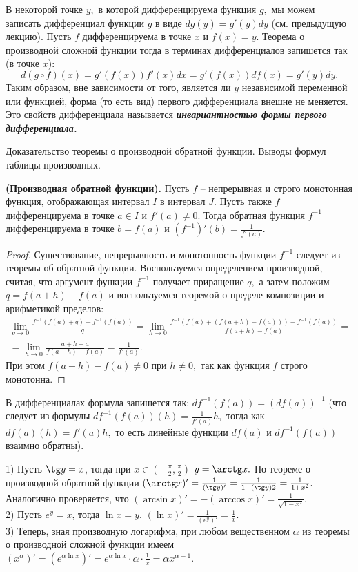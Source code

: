 В некоторой точке $y,$ в которой
дифференцируема функция $g,$
мы можем записать дифференциал
функции $g$ в виде $dg(y)=g'(y)dy$
(см. предыдущую лекцию). Пусть
$f$ дифференцируема в точке $x$
и $f(x)=y.$ Теорема
о производной сложной функции тогда
в терминах дифференциалов запишется
так (в точке $x$):
$$
d(g\circ f)(x)=g'(f(x))f'(x)dx=
g'(f(x))df(x)=g'(y)dy.
$$
Таким образом, вне зависимости от того, является
ли $y$ независимой переменной или функцией,
форма (то есть вид) первого дифференциала
внешне не меняется. Это свойств
дифференциала называется
\textbf{\emph{инвариантностью формы первого
дифференциала.}}
\newpage

\begin{problem}
Доказательство теоремы о производной обратной функции. Выводы формул таблицы
производных.
\end{problem}
\begin{proposition}
\textbf{(Производная обратной функции).}
Пусть $f$ -- непрерывная и строго монотонная функция,
отображающая интервал $I$ в интервал $J.$ Пусть также
$f$ дифференцируема в точке $a\in I$ и $f'(a)\neq0.$
Тогда обратная функция $f^{-1}$ дифференцируема
в точке $b=f(a)$ и $(f^{-1})'(b)=\frac{1}{f'(a)}.$
\end{proposition}
\begin{proof}
Существование, непрерывность и монотонность
функции $f^{-1}$ следует из теоремы об
обратной функции.
Воспользуемся определением производной, считая, что
аргумент функции $f^{-1}$ получает приращение $q,$
а затем положим $q=f(a+h)-f(a)$ и воспользуемся
теоремой о пределе композиции и арифметикой
пределов:
\begin{multline*}
\lim\limits_{q\rightarrow0}
\frac{f^{-1}(f(a)+q)-f^{-1}(f(a))}{q}=
\lim\limits_{h\rightarrow0}
\frac{f^{-1}(f(a)+(f(a+h)-f(a)))-f^{-1}(f(a))}
{f(a+h)-f(a)}=\\=
\lim\limits_{h\rightarrow0}
\frac{a+h-a}
{f(a+h)-f(a)}=\frac{1}{f'(a)}.
\end{multline*}
При этом $f(a+h)-f(a)\neq0$
при $h\neq0,$ так как функция
$f$ строго монотонна.
\end{proof}
В дифференциалах формула запишется так:
$df^{-1}(f(a))=(df(a))^{-1}$
(что следует из формулы
$df^{-1}(f(a))(h)=\frac{1}{f'(a)}h,$
тогда как $df(a)(h)=f'(a)h,$
то есть линейные функции
$df(a)$ и $df^{-1}(f(a))$
взаимно обратны).
\begin{example}
1) Пусть $\tg y=x$, тогда
при $x\in\left(-\frac{\pi}{2},
\frac{\pi}{2}\right)$ $y=\arctg x.$
По теореме о производной обратной
функции $(\arctg x)'=\frac{1}
{(\tg y)'}=\frac{1}{1+(\tg y)2}=
\frac{1}{1+x^2}.$
Аналогично проверяется, что
$(\arcsin x)'=-(\arccos x)'=
\frac{1}{\sqrt{1-x^2}}.$\\
2) Пусть $e^y=x$, тогда
$\ln x=y.$ $(\ln x)'=
\frac{1}{(e^y)'}=
\frac{1}{x}.$\\
3) Теперь, зная производную логарифма,
при любом вещественном $\alpha$ из
теоремы о производной сложной функции
имеем $(x^{\alpha})'=
(e^{\alpha\ln x})'=
e^{\alpha\ln x}\cdot\alpha
\cdot\frac{1}{x}=\alpha x^{\alpha-1}.$
\end{example}
